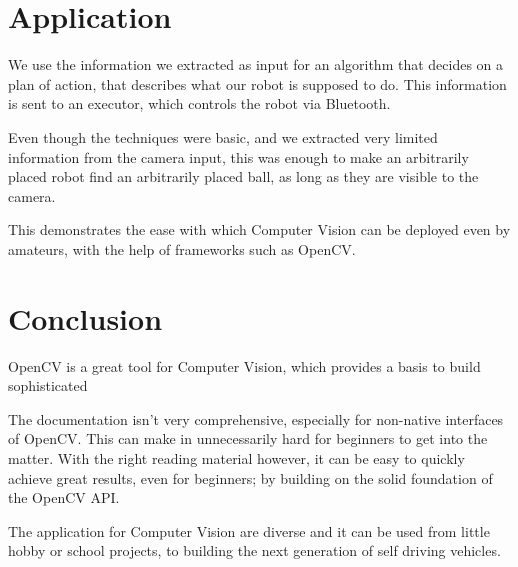 \documentclass[12pt, a4paper]{article}
\begin{document}
\section{Application}
We use the information we extracted as input for an algorithm that decides on a plan of action, that describes what our robot is supposed to do. This information is sent to an executor, which controls the robot via Bluetooth.

Even though the techniques were basic, and we extracted very limited information from the camera input, this was enough to make an arbitrarily placed robot find an arbitrarily placed ball, as long as they are visible to the camera.

This demonstrates the ease with which Computer Vision can be deployed even by amateurs, with the help of frameworks such as OpenCV.

\section{Conclusion}
OpenCV is a great tool for Computer Vision, which provides a basis to build sophisticated

The documentation isn't very comprehensive, especially for non-native interfaces of OpenCV. This can make in unnecessarily hard for beginners to get into the matter. With the right reading material however, it can be easy to quickly achieve great results, even for beginners; by building on the solid foundation of the OpenCV API.

The application for Computer Vision are diverse and it can be used from little hobby or school projects, to building the next generation of self driving vehicles.
\end{document}
